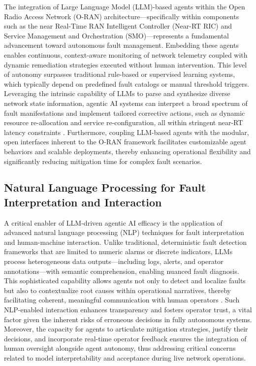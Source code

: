 \documentclass[11pt]{article}
\begin{document}
\begin{itemize}
The integration of Large Language Model (LLM)-based agents within the Open Radio Access Network (O-RAN) architecture—specifically within components such as the near Real-Time RAN Intelligent Controller (Near-RT RIC) and Service Management and Orchestration (SMO)—represents a fundamental advancement toward autonomous fault management. Embedding these agents enables continuous, context-aware monitoring of network telemetry coupled with dynamic remediation strategies executed without human intervention. This level of autonomy surpasses traditional rule-based or supervised learning systems, which typically depend on predefined fault catalogs or manual threshold triggers. Leveraging the intrinsic capability of LLMs to parse and synthesize diverse network state information, agentic AI systems can interpret a broad spectrum of fault manifestations and implement tailored corrective actions, such as dynamic resource re-allocation and service re-configuration, all within stringent near-RT latency constraints \cite{ref55}. Furthermore, coupling LLM-based agents with the modular, open interfaces inherent to the O-RAN framework facilitates customizable agent behaviors and scalable deployments, thereby enhancing operational flexibility and significantly reducing mitigation time for complex fault scenarios.

\subsection{Natural Language Processing for Fault Interpretation and Interaction}

A critical enabler of LLM-driven agentic AI efficacy is the application of advanced natural language processing (NLP) techniques for fault interpretation and human-machine interaction. Unlike traditional, deterministic fault detection frameworks that are limited to numeric alarms or discrete indicators, LLMs process heterogeneous data outputs—including logs, alerts, and operator annotations—with semantic comprehension, enabling nuanced fault diagnosis. This sophisticated capability allows agents not only to detect and localize faults but also to contextualize root causes within operational narratives, thereby facilitating coherent, meaningful communication with human operators \cite{ref55}. Such NLP-enabled interaction enhances transparency and fosters operator trust, a vital factor given the inherent risks of erroneous decisions in fully autonomous systems. Moreover, the capacity for agents to articulate mitigation strategies, justify their decisions, and incorporate real-time operator feedback ensures the integration of human oversight alongside agent autonomy, thus addressing critical concerns related to model interpretability and acceptance during live network operations.


\end{itemize}
\end{document}
